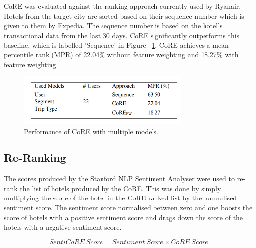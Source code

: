 CoRE was evaluated against the ranking approach currently used by Ryanair. Hotels from the target city are sorted based on their sequence number which is given to them by Expedia. The sequence number is based on the hotel's transactional data from the last 30 days. CoRE significantly outperforms this baseline, which is labelled 'Sequence' in Figure ~\ref{fig:coreperform}. CoRE achieves a mean percentile rank (MPR) of 22.04\% without feature weighting and 18.27\% with feature weighting.

\begin{figure}[h!]
\centering
\includegraphics[width=0.75\textwidth]{design_and_methodology/core_results.PNG}
\caption{\label{fig:coreperform} Performance of CoRE with multiple models.}
\end{figure}

\subsection{Re-Ranking}

The scores produced by the Stanford NLP Sentiment Analyser were used to re-rank the list of hotels produced by the CoRE. This was done by simply multiplying the score of the hotel in the CoRE ranked list by the normalised sentiment score. The sentiment score normalised between zero and one boosts the score of hotels with a positive sentiment score and drags down the score of the hotels with a negative sentiment score.

\begin{equation}
    SentiCoRE\ Score = Sentiment\ Score \times CoRE\ Score
\end{equation}